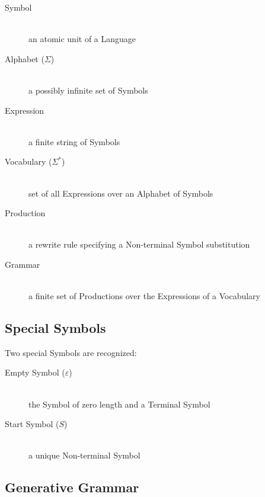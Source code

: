 \documentclass{article}
\begin{document}
    \begin{description}

    \item[Symbol] \hfill \\
    an atomic unit of a Language

    \item[Alphabet ($\Sigma$)] \hfill \\
    a possibly infinite set of Symbols

    \item[Expression] \hfill \\
    a finite string of Symbols

    \item[Vocabulary ($\Sigma^{*}$)] \hfill \\
    set of all Expressions over an Alphabet of Symbols

    \item[Production] \hfill \\
    a rewrite rule specifying a Non-terminal Symbol substitution

    \item[Grammar] \hfill \\
    a finite set of Productions over the Expressions of a Vocabulary

    \end{description}

\subsection{Special Symbols}

Two special Symbols are recognized:

    \begin{description}

    \item[Empty Symbol ($\varepsilon$)] \hfill \\
    the Symbol of zero length and a Terminal Symbol

    \item[Start Symbol ($S$)] \hfill \\
    a unique Non-terminal Symbol

    \end{description}

\subsection{Generative Grammar}
\end{document}
